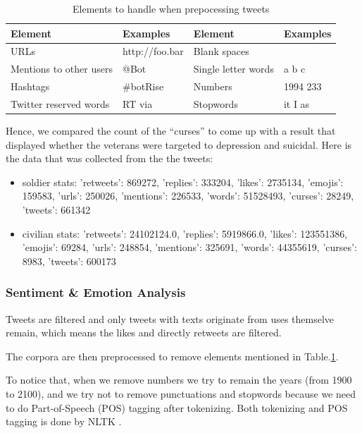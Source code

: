\begin{table}[h]
  \caption{Elements to handle when prepocessing tweets}
  \label{table:elementsRemoved}
  \centering
  \renewcommand{\tabularxcolumn}{m} %
  \begin{tabularx}{\textwidth}{l  l || l  l}
    \toprule
    \textbf{Element} & \textbf{Examples} & \textbf{Element}    & \textbf{Examples}
    \tabularnewline \midrule
    URLs
                     &
    http://foo.bar   & Blank spaces      &
    \tabularnewline \hline
    Mentions to other users
                     & @Bot              & Single letter words & a b c
    \tabularnewline \hline
    Hashtags
                     & \#botRise         & Numbers             & 1994 233
    \tabularnewline \hline
    Twitter reserved words
                     & RT via            & Stopwords
                     & it I as
    \tabularnewline \bottomrule
  \end{tabularx}
\end{table}

Hence, we compared the count of the “curses” to come up with a result that displayed whether the veterans were targeted to depression and suicidal. Here is the data that was collected from the the tweets:

\begin{itemize}
  \item soldier stats: {'retweets': 869272, 'replies': 333204, 'likes': 2735134, 'emojis': 159583, 'urls': 250026, 'mentions': 226533, 'words': 51528493, 'curses': 28249, 'tweets': 661342}
  \item civilian stats: {'retweets': 24102124.0, 'replies': 5919866.0, 'likes': 123551386, 'emojis': 69284, 'urls': 248854, 'mentions': 325691, 'words': 44355619, 'curses': 8983, 'tweets': 600173}
\end{itemize}

\subsubsection{Sentiment \& Emotion Analysis}

Tweets are filtered and only tweets with texts originate from uses themselve remain, which means the likes and directly retweets are filtered.

The corpora are then preprocessed to remove elements mentioned in Table.\ref{table:elementsRemoved}.

To notice that, when we remove numbers we try to remain the years (from 1900 to 2100), and we try not to remove punctuations and stopwords because we need to do Part-of-Speech (POS) tagging after tokenizing. Both tokenizing and POS tagging is done by NLTK \citep{NLTK}.

